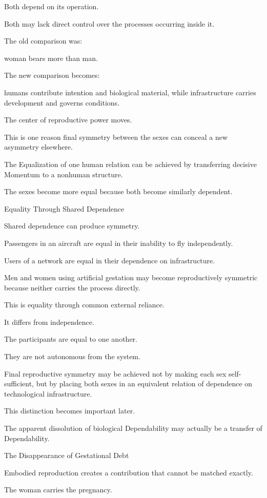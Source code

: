 Both depend on its operation.

Both may lack direct control over the processes occurring inside it.

The old comparison was:

woman bears more than man.

The new comparison becomes:

humans contribute intention and biological material, while infrastructure carries development and governs conditions.

The center of reproductive power moves.

This is one reason final symmetry between the sexes can conceal a new asymmetry elsewhere.

The Equalization of one human relation can be achieved by transferring decisive Momentum to a nonhuman structure.

The sexes become more equal because both become similarly dependent.

Equality Through Shared Dependence

Shared dependence can produce symmetry.

Passengers in an aircraft are equal in their inability to fly independently.

Users of a network are equal in their dependence on infrastructure.

Men and women using artificial gestation may become reproductively symmetric because neither carries the process directly.

This is equality through common external reliance.

It differs from independence.

The participants are equal to one another.

They are not autonomous from the system.

Final reproductive symmetry may be achieved not by making each sex self-sufficient, but by placing both sexes in an equivalent relation of dependence on technological infrastructure.

This distinction becomes important later.

The apparent dissolution of biological Dependability may actually be a transfer of Dependability.

The Disappearance of Gestational Debt

Embodied reproduction creates a contribution that cannot be matched exactly.

The woman carries the pregnancy.

